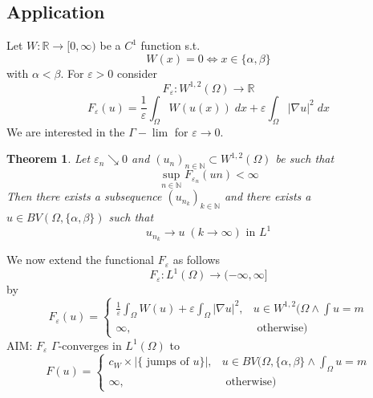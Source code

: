 \documentclass[a4paper, 12pt]{article}
\theoremstyle{plain}
\newtheorem{theorem}{Theorem}[section] %
\theoremstyle{definition}
\theoremstyle{lemma}
\theoremstyle{remark}
\theoremstyle{corollary}
\theoremstyle{example}
\begin{document}
	\subsection{Application}
	Let $W: \mathbb{R} \to [0, \infty)$ be a $C^1$ function s.t. \[W(x) = 0 \Leftrightarrow x \in \{\alpha, \beta\}\]
	with $\alpha < \beta$. For $\varepsilon > 0$ consider \[F_\varepsilon: W^{1,2}(\Omega) \to \mathbb{R}\]\[F_\varepsilon(u) = \frac{1}{\varepsilon} \int_\Omega W(u(x)) \; dx + \varepsilon \int_\Omega \left|\nabla u\right|^2 \; dx\]
	We are interested in the $\Gamma-\lim$ for $\varepsilon \to 0$.
	\begin{theorem}
		Let $\varepsilon_n \searrow 0$ and $(u_n)_{n \in \mathbb{N}} \subset W^{1,2}(\Omega)$ be such that \[\sup_{n \in \mathbb{N}} F_{\varepsilon_n} (un) < \infty\] Then there exists a subsequence $(u_{n_k})_{k \in \mathbb{N}}$ and there exists a $u \in BV(\Omega, \{\alpha, \beta\})$ such that \[u_{n_k} \to u \;(k \to \infty) \text{ in } L^1 \]
	\end{theorem}
	We now extend the functional $F_\varepsilon$ as follows \[F_\varepsilon: L^1(\Omega) \to (-\infty, \infty]\] by \[F_\varepsilon(u) = \begin{cases}
		\frac{1}{\varepsilon} \int_\Omega W(u) + \varepsilon \int_\Omega \left|\nabla u\right|^2, & u \in W^{1,2}(\Omega \land \int u = m\\
		\infty, & \text{ otherwise})
	\end{cases}\] 
	AIM: $F_\varepsilon$ $\Gamma$-converges in $L^1(\Omega)$ to \[F(u) = \begin{cases}
		c_W \times \left|\{\text{ jumps of $u$}\}\right|, & u \in BV(\Omega, \{\alpha, \beta\} \land \int_\Omega u = m\\
		\infty, & \text{ otherwise})
	\end{cases}\]
\end{document}

